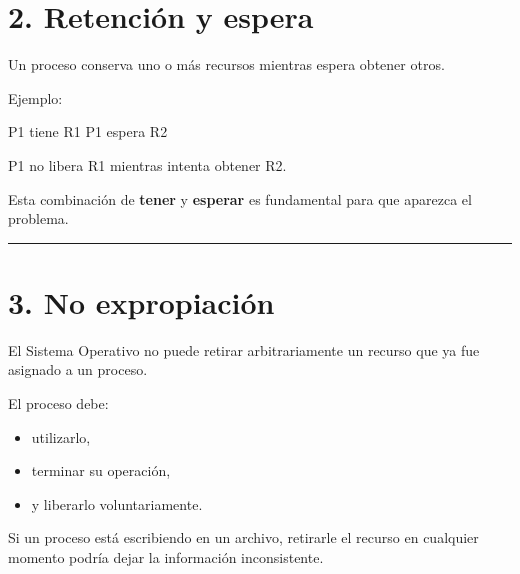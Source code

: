 \documentclass[
  spanish,
  letterpaper,
]{scrbook}
\newenvironment{Shaded}{\begin{snugshade}}{\end{snugshade}}
\newcommand{\NormalTok}[1]{\textcolor[rgb]{0.00,0.23,0.31}{#1}}
\providecommand{\tightlist}{%
  \setlength{\itemsep}{0pt}\setlength{\parskip}{0pt}}
\begin{document}

\chapter{2. Retención y espera}\label{retenciuxf3n-y-espera}

Un proceso conserva uno o más recursos mientras espera obtener otros.

Ejemplo:

\begin{Shaded}
\begin{Highlighting}[]
\NormalTok{P1 tiene R1}
\NormalTok{P1 espera R2}
\end{Highlighting}
\end{Shaded}

P1 no libera R1 mientras intenta obtener R2.

Esta combinación de \textbf{tener} y \textbf{esperar} es fundamental
para que aparezca el problema.

\begin{center}\rule{0.5\linewidth}{0.5pt}\end{center}


\chapter{3. No expropiación}\label{no-expropiaciuxf3n}

El Sistema Operativo no puede retirar arbitrariamente un recurso que ya
fue asignado a un proceso.

El proceso debe:

\begin{itemize}
\tightlist
\item
  utilizarlo,
\item
  terminar su operación,
\item
  y liberarlo voluntariamente.
\end{itemize}

\begin{tcolorbox}[enhanced jigsaw, arc=.35mm, bottomrule=.15mm, bottomtitle=1mm, breakable, colback=white, colbacktitle=quarto-callout-note-color!10!white, colframe=quarto-callout-note-color-frame, coltitle=black, left=2mm, leftrule=.75mm, opacityback=0, opacitybacktitle=0.6, rightrule=.15mm, title=\textcolor{quarto-callout-note-color}{\faInfo}\hspace{0.5em}{Ejemplo}, titlerule=0mm, toprule=.15mm, toptitle=1mm]

Si un proceso está escribiendo en un archivo, retirarle el recurso en
cualquier momento podría dejar la información inconsistente.

\end{tcolorbox}
\end{document}
